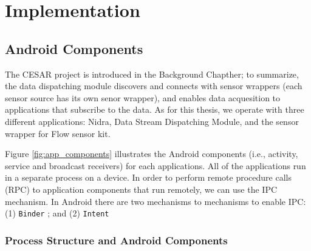 \chapter{Implementation}

%

\section{Android Components}
The CESAR project is introduced in the Background Chapther; to summarize, the data dispatching module discovers and connects with sensor wrappers (each sensor source has its own senor wrapper), and enables data acquesition to applications that subscribe to the data. As for this thesis, we operate with three different applications: Nidra, Data Stream Dispatching Module, and the sensor wrapper for Flow sensor kit. 

Figure \ref{fig:app_components} illustrates the Android components (i.e., activity, service and broadcast receivers) for each applications. All of the applications run in a separate process on a device. In order to perform remote procedure calls (RPC) to application components that run remotely, we can use the IPC mechanism. In Android there are two mechanisms to mechanisms to enable IPC: (1) \verb|Binder| ; and (2) \verb|Intent|

\subsection{Process Structure and Android Components}

